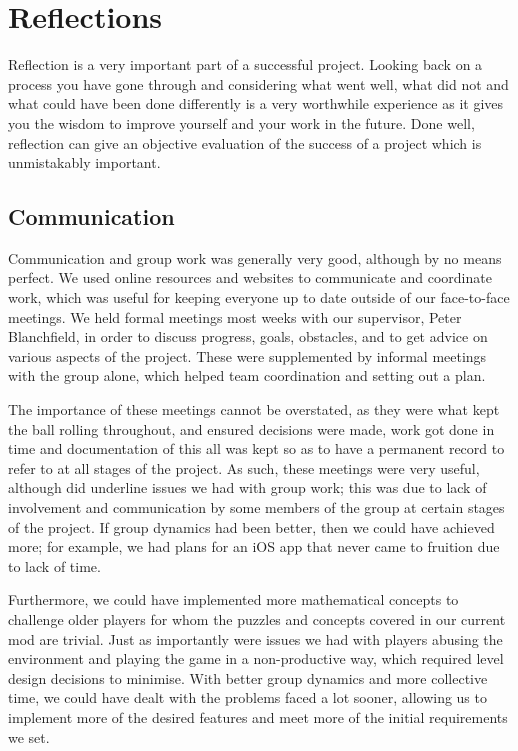 \chapter{Reflections}
\label{ch:reflections}
Reflection is a very important part of a successful project. Looking back on a process you
have gone through and considering what went well, what did not and what could have been
done differently is a very worthwhile experience as it gives you the wisdom to improve
yourself and your work in the future. Done well, reflection can give an objective evaluation
of the success of a project which is unmistakably important.

\section{Communication}
Communication and group work was generally very good, although by no means perfect. We
used online resources and websites to communicate and coordinate work, which was useful
for keeping everyone up to date outside of our face-to-face meetings. We held formal
meetings most weeks with our supervisor, Peter Blanchfield, in order to discuss progress,
goals, obstacles, and to get advice on various aspects of the project. These were
supplemented by informal meetings with the group alone, which helped team coordination
and setting out a plan.

The importance of these meetings cannot be overstated, as they
were what kept the ball rolling throughout, and ensured decisions were made, work got done
in time and documentation of this all was kept so as to have a permanent record to refer to
at all stages of the project. As such, these meetings were very useful, although did underline
issues we had with group work; this was due to lack of involvement and communication by some
members of the group at certain stages of the project. If group dynamics had been better,
then we could have achieved more; for example, we had plans for an iOS app that never came
to fruition due to lack of time.

Furthermore, we could have implemented more mathematical
concepts to challenge older players for whom the puzzles and concepts covered in our
current mod are trivial. Just as importantly were issues we had with players abusing the
environment and playing the game in a non-productive way, which required level design decisions
to minimise. With better group dynamics and more collective time, we could have dealt with
the problems faced a lot sooner, allowing us to implement more of the desired features and
meet more of the initial requirements we set.

